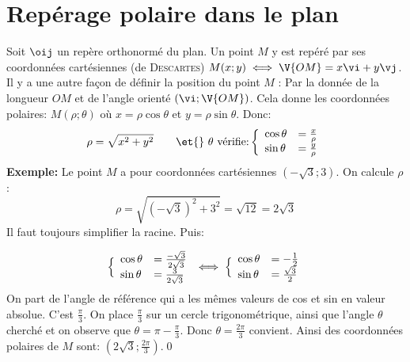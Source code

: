\documentclass[a4paper]{article}
\begin{document}

\section{Rep\'erage polaire dans le plan}
Soit $\oij$ un rep\`ere orthonorm\'e du plan. Un point $M$ y est rep\'er\'e
par ses coordonn\'ees cart\'esiennes (de \textsc{Descartes})   \ie{}
$M(x;y)\iff \V{OM}  = x\vi + y\vj$. Il y a une autre façon de d\'efinir
la position du point $M$ : Par la donn\'ee de la longueur $OM$ et de
l'angle orient\'e $(\vi  ; \V{OM} )$. Cela donne les coordonn\'ees
polaires: $M(\rho;\theta)$ o\`u $x=\rho\cos \theta$ et $y=\rho\sin
\theta$. Donc:
\[
\rho=\sqrt{x^2+y^2}\qquad \et{}\ \theta\ \text{v\'erifie:}
\left\{
\begin{array}[c]{ll}
\cos \theta&= \frac{x}{\rho}\\
\sin \theta&=\frac{y}{\rho}\\
  \end{array} \right.
\]
\hline
\noindent
{\bf Exemple:} 
 Le point $M$ a pour coordonn\'ees cart\'esiennes $(-\sqrt3;3)$. On calcule $\rho$:
\[ \rho=\sqrt{(-\sqrt3)^2+3^2} = \sqrt{12 } = 2\sqrt 3 \]
Il faut toujours simplifier la racine. Puis:

\[  
\Bigl\{
\begin{array}[c]{ll}
\cos \theta&=\frac{-\sqrt3}{2\sqrt 3} \\
\sin \theta&=\frac{3}{2\sqrt 3} 
  \end{array}
\iff 
\Bigl\{
\begin{array}[c]{ll}
\cos \theta&=-\frac12 \\
\sin \theta&=\frac{\sqrt3}{2} 
  \end{array}
 \]
On part de l'angle de r\'ef\'erence qui a les m\^emes valeurs de cos et sin
en valeur absolue. C'est $\frac{\pi}{3}$. On place $\frac{\pi}{3}$ sur
un cercle trigonom\'etrique, ainsi que l'angle $\theta$ cherch\'e et on
observe que $\theta=\pi- \frac{\pi}{3}$. Donc $\theta=\frac{2\pi}{3}$
convient. Ainsi des coordonn\'ees polaires de $M$ sont: $(2\sqrt
3;\frac{2\pi}{3})$.\qed %
\end{document}
